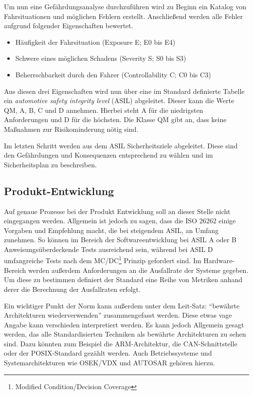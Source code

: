 \documentclass[
  a4paper,					    %
  twoside,
  DIV=calc,     				%
  bibliography=totoc,
  cleardoublepage=empty,
  ngerman,     					%
  final       					%
]{scrbook}
\begin{document}
Um nun eine Gefährdungsanalyse durchzuführen wird zu Beginn ein Katalog von Fahrsituationen und möglichen Fehlern erstellt. Anschließend werden alle Fehler aufgrund folgender Eigenschaften bewertet.

\begin{itemize}
    \item Häufigkeit der Fahrsituation (Exposure E; E0 bis E4)
    \item Schwere eines möglichen Schadens (Severity S; S0 bis S3)
    \item Beherrschbarkeit durch den Fahrer (Controllability C; C0 bis C3)
\end{itemize}

Aus diesen drei Eigenschaften wird nun über eine im Standard definierte Tabelle ein \emph{automotive safety integrity level} (ASIL) abgeleitet. Dieser kann die Werte QM, A, B, C und D annehmen. Hierbei steht A für die niedrigsten Anforderungen und D für die höchsten. Die Klasse QM gibt an, dass keine Maßnahmen zur Risikominderung nötig sind.

Im letzten Schritt werden aus dem ASIL Sicherheitsziele abgeleitet. Diese sind den Gefährdungen und Konsequenzen entsprechend zu wählen und im Sicherheitsplan zu beschreiben.


\subsection{Produkt-Entwicklung}
\label{sec:ISO26262_produkt_entwicklung}
Auf genaue Prozesse bei der Produkt Entwicklung soll an dieser Stelle nicht eingegangen werden. Allgemein ist jedoch zu sagen, dass die ISO 26262 einige Vorgaben und Empfehlung macht, die bei steigendem ASIL, an Umfang zunehmen. So können im Bereich der Softwareentwicklung bei ASIL A oder B Anweisungsüberdeckende Tests ausreichend sein, während bei ASIL D umfangreiche Tests nach dem MC/DC\footnote{Modified Condition/Decision Coverage} Prinzip gefordert sind. Im Hardware-Bereich werden außerdem Anforderungen an die Ausfallrate der Systeme gegeben. Um diese zu bestimmen definiert der Standard eine Reihe von Metriken anhand derer die Berechnung der Ausfallraten erfolgt.

Ein wichtiger Punkt der Norm kann außerdem unter dem Leit-Satz: "`bewährte Architekturen wiederverwenden"' zusammengefasst werden. Diese etwas vage Angabe kann verschieden interpretiert werden. Es kann jedoch Allgemein gesagt werden, das alle Standardisierten Techniken als bewährte Architekturen zu sehen sind. Dazu könnten zum Beispiel die ARM-Architektur, die CAN-Schnittstelle oder der POSIX-Standard gezählt werden. Auch Betriebssysteme und Systemarchitekturen wie OSEK/VDX und AUTOSAR gehören hierzu.
\end{document}
